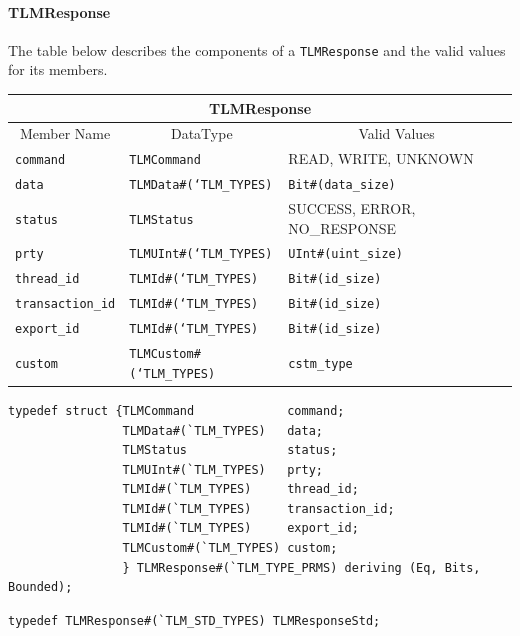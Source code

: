 \documentclass[twoside,letterpaper]{article}
\newcommand{\te}[1]{\texttt{#1}}
\begin{document}
\paragraph{\bf TLMResponse}  The table below describes the components of a
                \te{TLMResponse}  and the valid values for its members.


\begin{center}
\begin{tabular}{|p{1.2 in}|p{2 in}|p{3in}|}
\hline
\multicolumn{3}{|c|}{TLMResponse} \\
\hline
\multicolumn{1}{|c|}{Member Name}&\multicolumn{1}{|c|}{DataType}&\multicolumn{1}{|c|}{Valid Values} \\
\hline
\hline
\te{command}&\te{TLMCommand}&READ, WRITE, UNKNOWN\\
\hline
\te{data}&\te{TLMData\#(`TLM\_TYPES)}&\te{Bit\#(data\_size)}\\
\hline
\te{status}&\te{TLMStatus}&SUCCESS, ERROR, NO\_RESPONSE\\
\hline
\te{prty}&\te{TLMUInt\#(`TLM\_TYPES)}&\te{UInt\#(uint\_size)}\\
\hline
\te{thread\_id}&\te{TLMId\#(`TLM\_TYPES)}&\te{Bit\#(id\_size)}\\
\hline
\te{transaction\_id}&\te{TLMId\#(`TLM\_TYPES)}&\te{Bit\#(id\_size)}\\
\hline
\te{export\_id}&\te{TLMId\#(`TLM\_TYPES)}&\te{Bit\#(id\_size)}\\
\hline
\te{custom}&\te{TLMCustom\#(`TLM\_TYPES)}&\te{cstm\_type}\\
\hline
\end{tabular}
\end{center}


\begin{verbatim}
typedef struct {TLMCommand             command;
                TLMData#(`TLM_TYPES)   data;
                TLMStatus              status;
                TLMUInt#(`TLM_TYPES)   prty;
                TLMId#(`TLM_TYPES)     thread_id;
                TLMId#(`TLM_TYPES)     transaction_id;
                TLMId#(`TLM_TYPES)     export_id;
                TLMCustom#(`TLM_TYPES) custom;
                } TLMResponse#(`TLM_TYPE_PRMS) deriving (Eq, Bits, Bounded);
\end{verbatim}

\begin{verbatim}
typedef TLMResponse#(`TLM_STD_TYPES) TLMResponseStd;
\end{verbatim}
\end{document}
